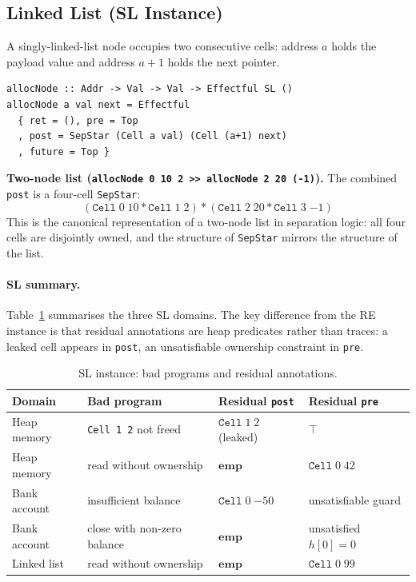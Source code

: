 \documentclass[acmsmall,screen]{acmart}
\newcommand{\sep}{*}
\begin{document}
\subsection{Linked List (SL Instance)}
\label{sec:ex-list}

A singly-linked-list node occupies two consecutive cells:
address $a$ holds the payload value and address $a{+}1$ holds the next pointer.

\begin{lstlisting}
allocNode :: Addr -> Val -> Val -> Effectful SL ()
allocNode a val next = Effectful
  { ret = (), pre = Top
  , post = SepStar (Cell a val) (Cell (a+1) next)
  , future = Top }
\end{lstlisting}

\noindent
\textbf{Two-node list (\lstinline{allocNode 0 10 2 >> allocNode 2 20 (-1)}).}
The combined \lstinline{post} is a four-cell \lstinline{SepStar}:
\[
  (\mathtt{Cell}\;0\;10 \sep \mathtt{Cell}\;1\;2)
  \sep
  (\mathtt{Cell}\;2\;20 \sep \mathtt{Cell}\;3\;{-1})
\]
This is the canonical representation of a two-node list in separation logic:
all four cells are disjointly owned, and the structure of \lstinline{SepStar}
mirrors the structure of the list.

\paragraph{SL summary.}
Table~\ref{tab:examples-sl} summarises the three SL domains.
The key difference from the RE instance is that residual annotations are
heap predicates rather than traces: a leaked cell appears in \lstinline{post},
an unsatisfiable ownership constraint in \lstinline{pre}.

\begin{table}[h]
\caption{SL instance: bad programs and residual annotations.}
\label{tab:examples-sl}
\begin{tabular}{llll}
\toprule
Domain & Bad program & Residual \lstinline{post} & Residual \lstinline{pre} \\
\midrule
Heap memory  & \lstinline{Cell 1 2} not freed  & $\mathtt{Cell}\;1\;2$ (leaked) & $\top$ \\
Heap memory  & read without ownership           & $\mathbf{emp}$ & $\mathtt{Cell}\;0\;42$ \\
Bank account & insufficient balance             & $\mathtt{Cell}\;0\;{-50}$ & unsatisfiable guard \\
Bank account & close with non-zero balance      & $\mathbf{emp}$ & unsatisfied $h[0]=0$ \\
Linked list  & read without ownership           & $\mathbf{emp}$ & $\mathtt{Cell}\;0\;99$ \\
\bottomrule
\end{tabular}
\end{table}
\end{document}
